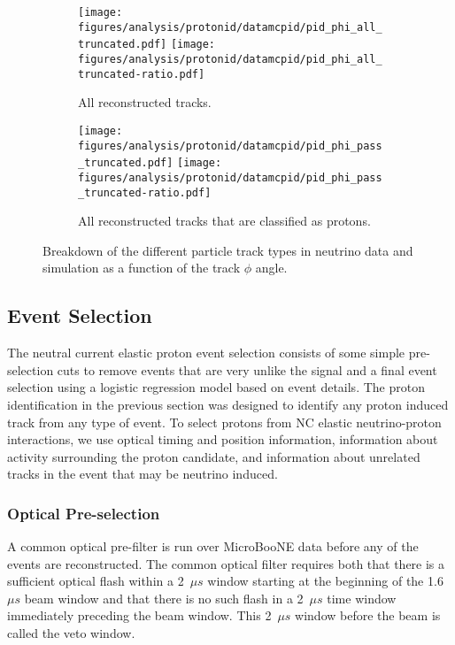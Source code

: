     \begin{figure}[h]
      \centering
      \begin{subfigure}[t]{2.8in}
        \texttt{[image: figures/analysis/protonid/datamcpid/pid\_phi\_all\_truncated.pdf]}
        \texttt{[image: figures/analysis/protonid/datamcpid/pid\_phi\_all\_truncated-ratio.pdf]}
        \caption{All reconstructed tracks.}
      \end{subfigure}
      \hspace{2pt}
      \begin{subfigure}[t]{2.8in}
        \texttt{[image: figures/analysis/protonid/datamcpid/pid\_phi\_pass\_truncated.pdf]}
        \texttt{[image: figures/analysis/protonid/datamcpid/pid\_phi\_pass\_truncated-ratio.pdf]}
        \caption{All reconstructed tracks that are classified as protons.}
      \end{subfigure}
      \caption{Breakdown of the different particle track types in neutrino data
      and simulation as a function of the track $\phi$ angle.}
      \label{fig:pidphi}
    \end{figure}

    \FloatBarrier


\subsection{Event Selection}\label{sec:selection}
  The neutral current elastic proton event selection consists of some simple
  pre-selection cuts to remove events that are very unlike the signal and a
  final event selection using a logistic regression model based on event
  details. The proton identification in the previous section was designed to
  identify any proton induced track from any type of event. To select protons
  from NC elastic neutrino-proton interactions, we use optical timing and
  position information, information about activity surrounding the proton
  candidate, and information about unrelated tracks in the event that may be
  neutrino induced.

  \subsubsection{Optical Pre-selection}\label{sec:optpresel}
    A common optical pre-filter is run over MicroBooNE data before any of the
    events are reconstructed. The common optical filter requires both that
    there is a sufficient optical flash within a 2~$\mu s$ window starting at
    the beginning of the 1.6~$\mu s$ beam window and that there is no such
    flash in a 2~$\mu s$ time window immediately preceding the beam window.
    This 2~$\mu s$ window before the beam is called the veto window.

